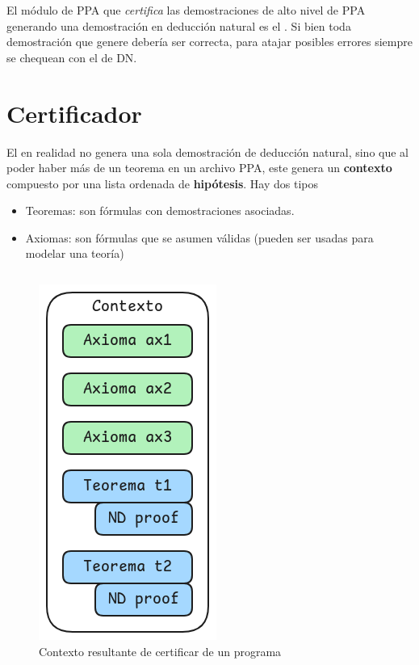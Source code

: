 El módulo de PPA que \textit{certifica} las demostraciones de alto nivel de PPA
generando una demostración en deducción natural es el \modCertifier{}. Si
bien toda demostración que genere debería ser correcta, para atajar posibles
errores siempre se chequean con el \modChecker{} de DN.



\section{Certificador}

El \modCertifier{} en realidad no genera una sola demostración de deducción
natural, sino que al poder haber más de un teorema en un archivo PPA, este
genera un \textbf{contexto} compuesto por una lista ordenada de
\textbf{hipótesis}. Hay dos tipos

\begin{itemize}
    \item Teoremas: son fórmulas con demostraciones asociadas.
    \item Axiomas: son fórmulas que se asumen válidas (pueden ser usadas para
    modelar una teoría)
\end{itemize}

\begin{figure}[H]
    \centering
    \begin{multicols}{2}
        \begin{tabular}{c}
            
        \end{tabular}
        \includegraphics[scale=0.5]{img/ppa-context.png}
    \end{multicols}
    \caption{Contexto resultante de certificar de un programa}
\end{figure}


